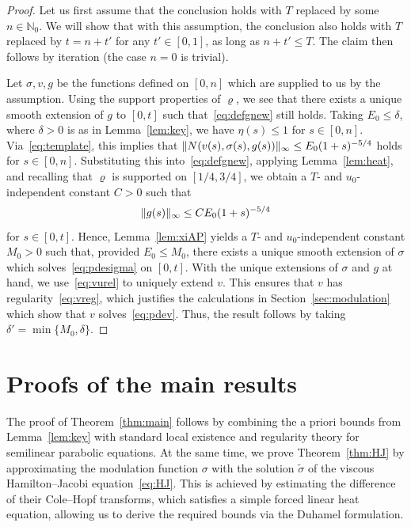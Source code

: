 \documentclass[12pt,oneside,a4paper,reqno]{amsart}
\numberwithin{equation}{section}
\theoremstyle{definition}
\theoremstyle{remark}
\newcommand{\bbN}{{\mathbb N}}
\DeclarePairedDelimiter{\norm}{\lVert}{\rVert}
\begin{document}
\begin{proof}
Let us first assume that the conclusion holds with $T$ replaced by some $n \in \bbN_0$. We will show that with this assumption, the conclusion also holds with $T$ replaced by $t = n + t'$ for any $t' \in [0,1]$, as long as $n+t' \leq T$. The claim then follows by iteration (the case $n = 0$ is trivial).

Let $\sigma,v,g$ be the functions defined on $[0,n]$ which are supplied to us by the assumption. Using the support properties of $\varrho$, we see that there exists a unique smooth extension of $g$ to $[0,t]$ such that~\eqref{eq:defgnew} still holds. Taking $E_0 \leq \delta$, where $\delta > 0$ is as in Lemma~\ref{lem:key}, we have $\eta(s) \leq 1$ for $s \in [0,n]$.
Via~\eqref{eq:template}, this implies that $\norm{N(v(s),\sigma(s),g(s))}_{\infty} \leq E_0 (1+s)^{-5/4}$ 
holds for $s \in [0,n]$. Substituting this into~\eqref{eq:defgnew}, applying Lemma~\ref{lem:heat}, and recalling that $\varrho$ is supported on $[1/4,3/4]$, we obtain a $T$- and $u_0$-independent constant $C > 0$ such that
\begin{equation}
\label{eq:gestfinal}
\norm{g(s)}_{\infty} \leq C E_0 (1+s)^{-5/4}
\end{equation}
for $s \in [0,t]$. Hence, Lemma~\ref{lem:xiAP} yields a $T$- and $u_0$-independent constant $M_0 > 0$ such that, provided $E_0 \leq M_0$, there exists a unique smooth extension of $\sigma$ which solves~\eqref{eq:pdesigma} on $[0,t]$.
With the unique extensions of $\sigma$ and $g$ at hand, we use~\eqref{eq:vurel} to uniquely extend $v$.
This ensures that $v$ has regularity~\eqref{eq:vreg}, which justifies the calculations in Section~\ref{sec:modulation} which show that $v$ solves~\eqref{eq:pdev}. Thus, the result follows by taking $\delta' = \min\{M_0,\delta\}$.
\end{proof}

\section{Proofs of the main results} \label{sec:proof}

The proof of Theorem~\ref{thm:main} follows by combining the a priori bounds from Lemma~\ref{lem:key} with standard local existence and regularity theory for semilinear parabolic equations. At the same time, we prove Theorem~\ref{thm:HJ} by approximating the modulation function $\sigma$ with the solution $\tilde\sigma$ of the viscous Hamilton--Jacobi equation~\eqref{eq:HJ}. This is achieved by estimating the difference of their Cole--Hopf transforms, which satisfies a simple forced linear heat equation, allowing us to derive the required bounds via the Duhamel formulation.
\end{document}
